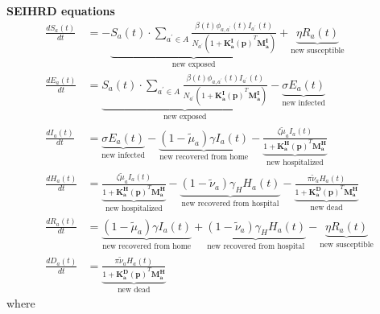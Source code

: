\documentclass[11pt]{article}
\begin{document}
\textbf{SEIHRD equations}
\begin{align}
\frac{dS_a(t)}{dt} &= -\underbrace{S_a(t) \cdot \sum_{a^\prime \in A} \frac{\beta(t) \phi_{a, a^\prime}(t) I_{a^\prime}(t)}{N_{a^\prime} (1 + \boldsymbol{K_a^I(p)}^T \boldsymbol{M_a^I})}}_{\text{new exposed}} + \underbrace{\eta R_a(t)}_{\text{new susceptible}} \\
\frac{dE_a(t)}{dt} &= \underbrace{S_a(t) \cdot \sum_{a^\prime \in A} \frac{\beta(t) \phi_{a, a^\prime}(t) I_{a^\prime}(t)}{N_{a^\prime} (1 + \boldsymbol{K_a^I(p)}^T\boldsymbol{M_a^I})}}_{\text{new exposed}} - \underbrace{\sigma E_a(t)}_{\text{new infected}} \\
\frac{dI_a(t)}{dt} &= \underbrace{\sigma E_a(t)}_{\text{new infected}} - \underbrace{(1-\tilde{\mu}_a)\gamma I_a(t)}_{\text{new recovered from home}} - \underbrace{\frac{\zeta \tilde{\mu}_a I_a(t)}{1 + \boldsymbol{K_a^H(p)}^T \boldsymbol{M_a^H}}}_{\text{new hospitalized}} \\
\frac{dH_a(t)}{dt} &= \underbrace{\frac{\zeta \tilde{\mu}_a I_a(t)}{1 + \boldsymbol{K_a^H(p)}^T \boldsymbol{M_a^H}}}_{\text{new hospitalized}} - \underbrace{(1-\tilde{\nu}_a)\gamma_H H_a(t)}_{\text{new recovered from hospital}} - \underbrace{\frac{\pi \tilde{\nu}_a H_a(t)}{1 + \boldsymbol{K_a^D(p)}^T\boldsymbol{M_a^H}}}_{\text{new dead}} \\
\frac{dR_a(t)}{dt} &= \underbrace{(1-\tilde{\mu}_a) \gamma I_a(t)}_{\text{new recovered from home}} + \underbrace{(1-\tilde{\nu}_a)\gamma_H H_a(t)}_{\text{new recovered from hospital}} - \underbrace{\eta R_a(t)}_{\text{new susceptible}} \\
\frac{dD_a(t)}{dt} &= \underbrace{\frac{\pi \tilde{\nu}_a H_a(t)}{1 + \boldsymbol{K_a^D(p)}^T\boldsymbol{M_a^H}}}_{\text{new dead}}
\end{align}
where
\end{document}
